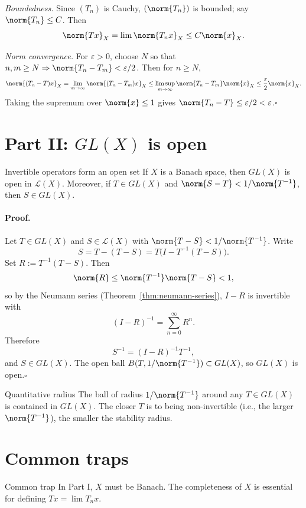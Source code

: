 \documentclass[11pt]{article}
\begin{document}
\emph{Boundedness.} Since $(T_n)$ is Cauchy, $(\norm{T_n})$ is bounded; say $\norm{T_n}\le C$. Then
\[
\norm{Tx}_X=\lim\norm{T_nx}_X\le C\norm{x}_X.
\]

\emph{Norm convergence.} For $\varepsilon>0$, choose $N$ so that $n,m\ge N\Rightarrow\norm{T_n-T_m}<\varepsilon/2$. Then for $n\ge N$,
\[
\norm{(T_n-T)x}_X=\lim_{m\to\infty}\norm{(T_n-T_m)x}_X
\le\limsup_{m\to\infty}\norm{T_n-T_m}\norm{x}_X
\le\frac{\varepsilon}{2}\norm{x}_X.
\]
Taking the supremum over $\norm{x}\le 1$ gives $\norm{T_n-T}\le\varepsilon/2<\varepsilon$.\hfill$\square$

\section{Part II: $GL(X)$ is open}

\begin{thmbox}{Invertible operators form an open set}
If $X$ is a Banach space, then $GL(X)$ is open in $\mathcal L(X)$. Moreover, if $T\in GL(X)$ and $\norm{S-T}<1/\norm{T^{-1}}$, then $S\in GL(X)$.
\end{thmbox}

\paragraph{Proof.}
Let $T\in GL(X)$ and $S\in\mathcal L(X)$ with $\norm{T-S}<1/\norm{T^{-1}}$. Write
\[
S=T-(T-S)=T\bigl(I-T^{-1}(T-S)\bigr).
\]
Set $R:=T^{-1}(T-S)$. Then
\[
\norm{R}\le\norm{T^{-1}}\norm{T-S}<1,
\]
so by the Neumann series (Theorem~\ref{thm:neumann-series}), $I-R$ is invertible with
\[
(I-R)^{-1}=\sum_{n=0}^{\infty}R^n.
\]
Therefore
\[
S^{-1}=(I-R)^{-1}T^{-1},
\]
and $S\in GL(X)$. The open ball $B(T,1/\norm{T^{-1}})\subset GL(X)$, so $GL(X)$ is open.\hfill$\square$

\begin{exbox}{Quantitative radius}
The ball of radius $1/\norm{T^{-1}}$ around any $T\in GL(X)$ is contained in $GL(X)$. The closer $T$ is to being non-invertible (i.e., the larger $\norm{T^{-1}}$), the smaller the stability radius.
\end{exbox}

\section{Common traps}

\begin{warningbox}{Common trap}
In Part I, $X$ must be Banach. The completeness of $X$ is essential for defining $Tx=\lim T_nx$.
\end{warningbox}
\end{document}

